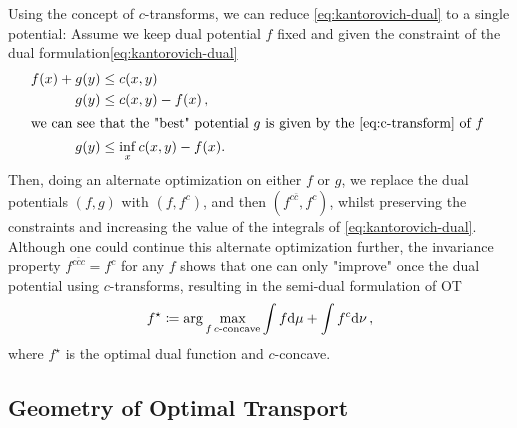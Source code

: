 Using the concept of $c$-transforms, we can reduce \eqref{eq:kantorovich-dual} to a single potential: Assume we keep dual potential $f$ fixed and given the constraint of the dual formulation\eqref{eq:kantorovich-dual}
\begin{align*}
  f(x)+g(y) & \leq c(x, y) \\
  g(y) & \leq c(x, y)-f(x)\,, \\
  \intertext{we can see that the "best" potential $g$ is given by the \cref{eq:c-transform} of $f$ }
  \label{eq:best_g} g(y) & \leq \inf _x c(x, y)-f(x).
\end{align*} 
Then, doing an alternate optimization on either $f$ or $g$, we replace the dual potentials $(f, g)$ with $(f, f^c)$, and then $(f^{c\bar{c}}, f^c)$, whilst preserving the constraints and increasing the value of the integrals of \eqref{eq:kantorovich-dual}.  
Although one could continue this alternate optimization further, the invariance property $f^{c\bar{c}c} = f^c$ for any $f$ shows that one can only "improve" once the dual potential using $c$-transforms, resulting in the semi-dual formulation of \acrlong{OT}
\begin{equation} \label{eq:semi-dual}
  f^\star \coloneqq \arg\max_{f\, c\text{-concave}} \int f \textrm{d}\mu + \int f^c\textrm{d}\nu\,,
\end{equation}
where $f^\star$ is the optimal dual function and $c$-concave.
\subsection{Geometry of Optimal Transport}
\label{sec:background_brenier}

